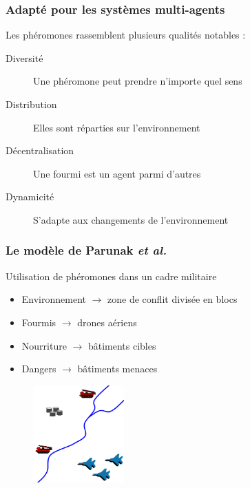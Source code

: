 \documentclass{beamer}
\begin{document}
\begin{frame}

  \frametitle{Adapté pour les systèmes multi-agents}

  Les phéromones rassemblent plusieurs qualités notables :

  \vfill

  \begin{block}{}
    \begin{description}
    \item[Diversité]{Une phéromone peut prendre n'importe quel sens}
    \item[Distribution]{Elles sont réparties sur l'environnement}
    \item[Décentralisation]{Une fourmi est un agent parmi d'autres}
    \item[Dynamicité]{S'adapte aux changements de l'environnement}
    \end{description}
  \end{block}

\end{frame}

\begin{frame}

  \frametitle{Le modèle de Parunak \textit{et al.}}

  \begin{block}{Utilisation de phéromones dans un cadre militaire}
    \begin{itemize}
    \item{Environnement  $\rightarrow$ zone de conflit divisée en blocs}
    \item{Fourmis $\rightarrow$ drones aériens}
    \item{Nourriture $\rightarrow$ bâtiments cibles}
    \item{Dangers $\rightarrow$ bâtiments menaces}
    \end{itemize}
  \end{block}

  \begin{figure}
    \centering
    \includegraphics[width=3.5cm]{terrain_real.png}
  \end{figure}

\end{frame}
\end{document}
